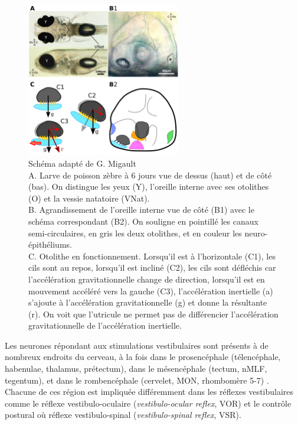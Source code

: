 \begin{figure}
\centering
\includegraphics[width=0.6\textwidth]{./files/appareil_vestibulaire.svg.png}
\caption{
Schéma adapté de G. Migault
\\
A. Larve de poisson zèbre à 6 jours vue de dessus (haut) et de côté (bas). On distingue les yeux (Y), l'oreille interne avec ses otolithes (O) et la vessie natatoire (VNat).
\\
B. Agrandissement de l'oreille interne vue de côté (B1) avec le schéma correspondant (B2). On souligne en pointillé les canaux semi-circulaires, en gris les deux otolithes, et en couleur les neuro-épithéliums.
\\
C. Otolithe en fonctionnement. Lorsqu'il est à l'horizontale (C1), les cils sont au repos, lorsqu'il est incliné (C2), les cils sont défléchis car l'accélération gravitationnelle change de direction, lorsqu'il est en mouvement accéléré vers la gauche (C3), l'accélération inertielle (a) s'ajoute à l'accélération gravitationnelle (g) et donne la résultante (r). On voit que l'utricule ne permet pas de différencier l'accélération gravitationnelle de l'accélération inertielle.}
\end{figure}

Les neurones répondant aux stimulations vestibulaires sont présents à de nombreux endroits du cerveau, à la fois dans le prosencéphale (télencéphale, habenulae, thalamus, prétectum), dans le mésencéphale (tectum, nMLF, tegentum), et dans le rombencéphale (cervelet, MON, rhombomère 5-7) \cite{favre-bulle_cellular-resolution_2018}. Chacune de ces région est impliquée différemment dans les réflexes vestibulaires comme le réflexe vestibulo-oculaire (\emph{vestibulo-ocular reflex}, VOR) et le contrôle postural où réflexe vestibulo-spinal (\emph{vestibulo-spinal reflex}, VSR).

